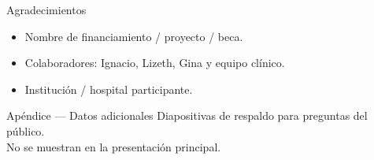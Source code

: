 \documentclass[aspectratio=169, 11pt]{beamer}
\begin{document}
\begin{frame}{Agradecimientos}
  \begin{itemize}
    \item Nombre de financiamiento / proyecto / beca.
    \item Colaboradores: Ignacio, Lizeth, Gina y equipo clínico.
    \item Institución / hospital participante.
  \end{itemize}
\end{frame}


\appendix

\begin{frame}{Apéndice — Datos adicionales}
  Diapositivas de respaldo para preguntas del público.\\
  No se muestran en la presentación principal.
\end{frame}
\end{document}
